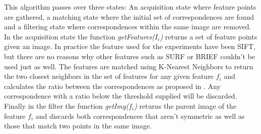 \documentclass{article}
\begin{document}
This algorithm passes over three states: An acquisition state where 
feature points are gathered, a matching state where the initial set of 
correspondences are found and a filtering state where correspondences 
within the same image are removed. In the acquisition state the function 
\emph{getFeatures($I_i$)} returns a set of feature points given an 
image.  In practice the feature used for the experiments have been 
SIFT\cite{lowe2004sift}, but there are no reasons why other features 
such as SURF\cite{bay2006surf} or BRIEF\cite{calonder2010brief} couldn't 
be used just as well. The features are matched using K-Nearest Neighbors 
to return the two closest neighbors in the set of features for any given 
feature $f_i$ and calculates the ratio between the correspondences as 
proposed in \cite{lowe2004sift}.  Any correspondence with a ratio below 
the threshold supplied will be discarded. Finally in the filter the 
function \emph{getImg($f_i$)} returns the parent image of the feature 
$f_i$ and discards both correspondences that aren't symmetric as well as 
those that match two points in the same image.
\end{document}
